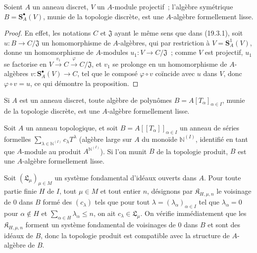 \begin{proposition}[19.3.2]
\label{0.19.3.2-fr}
Soient $A$ un anneau discret, $V$ un $A$-module projectif~; l'algèbre
symétrique $B=\mathbf S_A^\bullet(V)$, munie de la topologie discrète, est une
$A$-algèbre formellement lisse.
\end{proposition}

\begin{proof}
En effet, les notations $C$ et $\mathfrak J$ ayant le même sens que dans
(19.3.1), soit $u:B\to C/\mathfrak J$ un homomorphisme de $A$-algèbres, qui
par restriction à $V=\mathbf S_A^1(V)$, donne un homomorphisme de $A$-modules
$u_1:V\to C/\mathfrak J$~; comme $V$ est projectif, $u_1$ se factorise en
$V\xrightarrow{v_1}C\xrightarrow{\varphi}C/\mathfrak J$, et $v_1$ se
prolonge en un homomorphisme de $A$-algèbres
$v:\mathbf S_A^\bullet(V)\to C$, tel que le composé
$\varphi\circ v$ coïncide avec $u$ dans $V$, donc
$\varphi\circ v=u$, ce qui démontre la proposition.
\end{proof}

\begin{corollary}[19.3.3]
\label{0.19.3.3-fr}
Si $A$ est un anneau discret, toute algèbre de polynômes
$B=A[T_\alpha]_{\alpha\in I}$, munie de la topologie discrète, est une
$A$-algèbre formellement lisse.
\end{corollary}

\begin{proposition}[19.3.4]
\label{0.19.3.4-fr}
Soit $A$ un anneau topologique, et soit
$B=A[[T_\alpha]]_{\alpha\in I}$ un anneau de séries formelles
$\sum_{\lambda\in\mathbb{N}^{(I)}}c_\lambda T^\lambda$ (algèbre large sur
$A$ du monoïde $\mathbb{N}^{(I)}$, identifié en tant que $A$-module au produit
$A^{\mathbb{N}^{(I)}}$). Si l'on munit $B$ de la topologie produit, $B$ est une
$A$-algèbre formellement lisse.
\end{proposition}

Soit $(\mathfrak L_\mu)_{\mu\in M}$ un système fondamental d'idéaux ouverts
dans $A$. Pour toute partie finie $H$ de $I$, tout $\mu\in M$ et tout entier
$n$, désignons par $\mathfrak K_{H,\mu,n}$ le voisinage de $0$ dans $B$ formé
des $(c_\lambda)$ tels que pour tout
$\lambda=(\lambda_\alpha)_{\alpha\in I}$ tel que
$\lambda_\alpha=0$ pour $\alpha\notin H$ et
$\sum_{\alpha\in H}\lambda_\alpha\leq n$, on ait
$c_\lambda\in\mathfrak L_\mu$. On vérifie immédiatement que les
$\mathfrak K_{H,\mu,n}$ forment un système fondamental de voisinages de $0$
dans $B$ et sont des idéaux de $B$, donc la topologie produit est compatible
avec la structure de $A$-algèbre de $B$.

